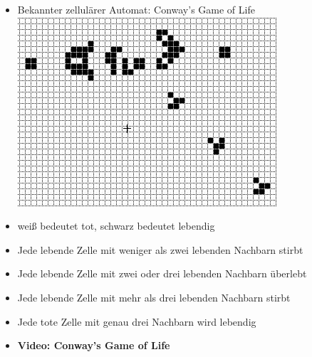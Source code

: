 \documentclass{beamer}
\begin{document}
\begin{frame}{\insertsection}{\insertsubsection}
    \begin{itemize}
        \item Bekannter zellulärer Automat: Conway's Game of Life
        \includegraphics[scale=0.6]{conways.png}
    \end{itemize}
\end{frame}

\begin{frame}{\insertsection}{\insertsubsection}
    \begin{itemize}
        \item weiß bedeutet tot, schwarz bedeutet lebendig
        \item Jede lebende Zelle mit weniger als zwei lebenden Nachbarn stirbt
        \item Jede lebende Zelle mit zwei oder drei lebenden Nachbarn überlebt
        \item Jede lebende Zelle mit mehr als drei lebenden Nachbarn stirbt
        \item Jede tote Zelle mit genau drei Nachbarn wird lebendig
        \item \textbf{Video: Conway's Game of Life}
    \end{itemize}
\end{frame}
\end{document}
